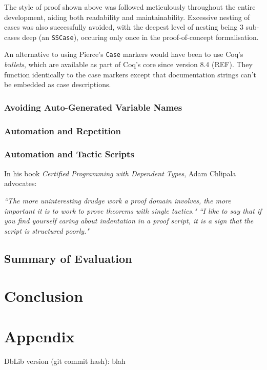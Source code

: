 \documentclass[]{unswthesis}
\let\c\texttt
\let\i\textit
\begin{document}
The style of proof shown above was followed meticulously throughout the entire development, aiding both readability and maintainability. Excessive nesting of cases was also successfully avoided, with the deepest level of nesting being 3 sub-cases deep (an \c{SSCase}), occuring only once in the proof-of-concept formalisation.

An alternative to using Pierce's \c{Case} markers would have been to use Coq's \i{bullets}, which are available as part of Coq's core since version 8.4 (REF). They function identically to the case markers except that documentation strings can't be embedded as case descriptions.

\subsection{Avoiding Auto-Generated Variable Names}

\subsection{Automation and Repetition}


\subsection{Automation and Tactic Scripts}

In his book \i{Certified Programming with Dependent Types}, Adam Chlipala advocates:

\i{``The more uninteresting drudge work a proof domain involves, the more important it is to work to prove theorems with single tactics."}
\i{``I like to say that if you find yourself caring about indentation in a proof script, it is a sign that the script is structured poorly."}

\section{Summary of Evaluation}

\chapter{Conclusion}

\backmatter
\pagebreak



\chapter{Appendix}

DbLib version (git commit hash): blah
\end{document}
